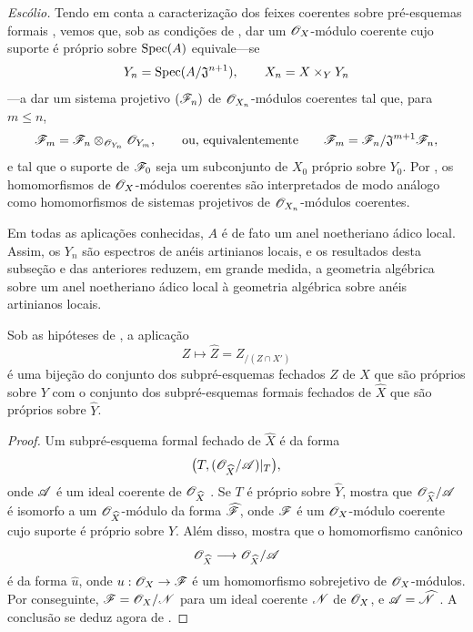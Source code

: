 \begin{env}[5.1.7]
\label{III.5.1.7}
\emph{Escólio.}
Tendo em conta a caracterização dos feixes coerentes sobre
pré-esquemas formais , vemos que, sob as
condições de , dar um
$\mathscr{O}_X$-módulo coerente cujo suporte é próprio sobre $\operatorname{Spec}(A)$
equivale---se
\[
  Y_n=\operatorname{Spec}(A/\mathfrak{J}^{n+1}),\qquad
  X_n=X\times_Y Y_n
\]
---a dar um sistema projetivo $(\mathscr{F}_n)$ de
$\mathscr{O}_{X_n}$-módulos coerentes tal que, para $m\leq n$,
\[
  \mathscr{F}_m
  =
  \mathscr{F}_n\otimes_{\mathscr{O}_{Y_n}}\mathscr{O}_{Y_m},
  \qquad\text{ou, equivalentemente}\qquad
  \mathscr{F}_m
  =
  \mathscr{F}_n/\mathfrak{J}^{m+1}\mathscr{F}_n,
\]
e tal que o suporte de $\mathscr{F}_0$ seja um subconjunto de $X_0$
próprio sobre $Y_0$. Por , os homomorfismos de
$\mathscr{O}_X$-módulos coerentes são interpretados de modo análogo como
homomorfismos de sistemas projetivos de
$\mathscr{O}_{X_n}$-módulos coerentes.


Em todas as aplicações conhecidas, $A$ é de fato um anel
noetheriano ádico local. Assim, os $Y_n$ são espectros de anéis
artinianos locais, e os resultados desta subseção e das
anteriores reduzem, em grande medida, a geometria algébrica sobre um
anel noetheriano ádico local à geometria algébrica sobre anéis
artinianos locais.
\end{env}

\begin{corollary}[5.1.8]
\label{III.5.1.8}
Sob as hipóteses de , a aplicação
\[
  Z\longmapsto\widehat{Z}=Z_{/(Z\cap X')}
\]
é uma bijeção do conjunto dos subpré-esquemas fechados $Z$ de $X$
que são próprios sobre $Y$ com o conjunto dos subpré-esquemas
formais fechados de $\widehat{X}$ que são próprios sobre
$\widehat{Y}$.
\end{corollary}

\begin{proof}
Um subpré-esquema formal fechado de $\widehat{X}$ é da forma
\[
  \bigl(T,
    (\mathscr{O}_{\widehat{X}}/\mathscr{A})|_T\bigr),
\]
onde $\mathscr{A}$ é um ideal coerente de
$\mathscr{O}_{\widehat{X}}$ . Se $T$ é próprio sobre
$\widehat{Y}$,  mostra que
$\mathscr{O}_{\widehat{X}}/\mathscr{A}$ é isomorfo a um
$\mathscr{O}_{\widehat{X}}$-módulo da forma
$\widehat{\mathscr{F}}$, onde $\mathscr{F}$ é um
$\mathscr{O}_X$-módulo coerente cujo suporte é próprio sobre $Y$. Além disso,
 mostra que o homomorfismo canônico
\[
  \mathscr{O}_{\widehat{X}}
  \longrightarrow
  \mathscr{O}_{\widehat{X}}/\mathscr{A}
\]
é da forma $\widehat{u}$, onde
$u:\sh{O}_X\to\sh{F}$ é um homomorfismo sobrejetivo de
$\mathscr{O}_X$-módulos. Por conseguinte,
$\mathscr{F}=\mathscr{O}_X/\mathscr{N}$ para um ideal coerente $\mathscr{N}$ de
$\mathscr{O}_X$, e
$\mathscr{A}=\widehat{\mathscr{N}}$ . A conclusão se
deduz agora de .
\end{proof}


